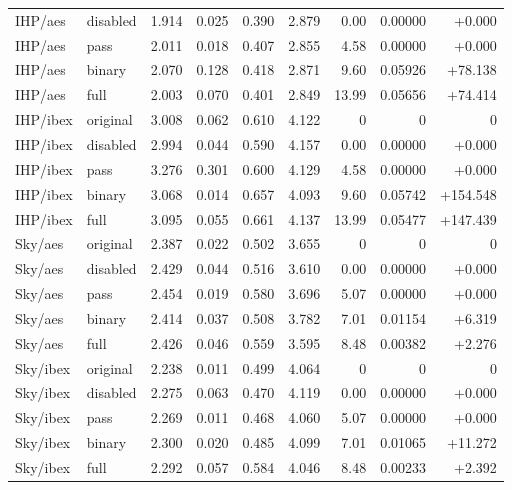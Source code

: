 \begin{tabular}{llrrrrrrr}
IHP/aes & disabled & 1.914 & 0.025 & 0.390 & 2.879 & 0.00 & 0.00000 & +0.000 \\
IHP/aes & pass & 2.011 & 0.018 & 0.407 & 2.855 & 4.58 & 0.00000 & +0.000 \\
IHP/aes & binary & 2.070 & 0.128 & 0.418 & 2.871 & 9.60 & 0.05926 & +78.138 \\
IHP/aes & full & 2.003 & 0.070 & 0.401 & 2.849 & 13.99 & 0.05656 & +74.414 \\
IHP/ibex & original & 3.008 & 0.062 & 0.610 & 4.122 & 0 & 0 & 0 \\
IHP/ibex & disabled & 2.994 & 0.044 & 0.590 & 4.157 & 0.00 & 0.00000 & +0.000 \\
IHP/ibex & pass & 3.276 & 0.301 & 0.600 & 4.129 & 4.58 & 0.00000 & +0.000 \\
IHP/ibex & binary & 3.068 & 0.014 & 0.657 & 4.093 & 9.60 & 0.05742 & +154.548 \\
IHP/ibex & full & 3.095 & 0.055 & 0.661 & 4.137 & 13.99 & 0.05477 & +147.439 \\
Sky/aes & original & 2.387 & 0.022 & 0.502 & 3.655 & 0 & 0 & 0 \\
Sky/aes & disabled & 2.429 & 0.044 & 0.516 & 3.610 & 0.00 & 0.00000 & +0.000 \\
Sky/aes & pass & 2.454 & 0.019 & 0.580 & 3.696 & 5.07 & 0.00000 & +0.000 \\
Sky/aes & binary & 2.414 & 0.037 & 0.508 & 3.782 & 7.01 & 0.01154 & +6.319 \\
Sky/aes & full & 2.426 & 0.046 & 0.559 & 3.595 & 8.48 & 0.00382 & +2.276 \\
Sky/ibex & original & 2.238 & 0.011 & 0.499 & 4.064 & 0 & 0 & 0 \\
Sky/ibex & disabled & 2.275 & 0.063 & 0.470 & 4.119 & 0.00 & 0.00000 & +0.000 \\
Sky/ibex & pass & 2.269 & 0.011 & 0.468 & 4.060 & 5.07 & 0.00000 & +0.000 \\
Sky/ibex & binary & 2.300 & 0.020 & 0.485 & 4.099 & 7.01 & 0.01065 & +11.272 \\
Sky/ibex & full & 2.292 & 0.057 & 0.584 & 4.046 & 8.48 & 0.00233 & +2.392 \\
\bottomrule
\end{tabular}
